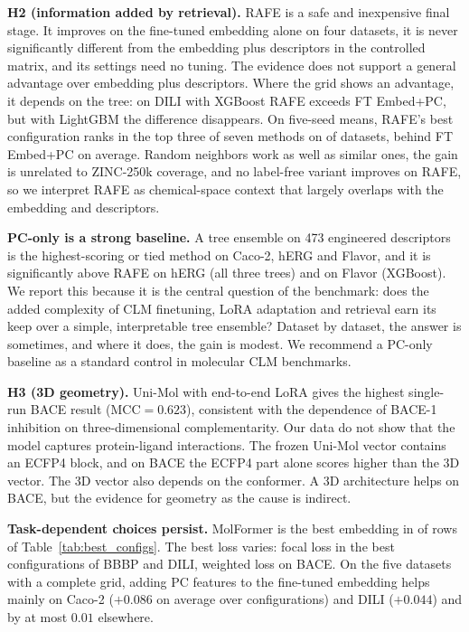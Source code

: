 \documentclass[pdflatex,sn-mathphys-num]{sn-jnl}%
\begin{document}
\textbf{H2 (information added by retrieval).} RAFE is a safe and inexpensive final stage. It improves on the fine-tuned embedding alone on four datasets, it is never significantly different from the embedding plus descriptors in the controlled matrix, and its settings need no tuning. The evidence does not support a general advantage over embedding plus descriptors. Where the grid shows an advantage, it depends on the tree: on DILI with XGBoost RAFE exceeds FT Embed+PC, but with LightGBM the difference disappears. On five-seed means, RAFE's best configuration ranks in the top three of seven methods on \ntop{} of \nds{} datasets, behind FT Embed+PC on average. Random neighbors work as well as similar ones, the gain is unrelated to ZINC-250k coverage, and no label-free variant improves on RAFE, so we interpret RAFE as chemical-space context that largely overlaps with the embedding and descriptors.

\textbf{PC-only is a strong baseline.} A tree ensemble on 473 engineered descriptors is the highest-scoring or tied method on Caco-2, hERG and Flavor, and it is significantly above RAFE on hERG (all three trees) and on Flavor (XGBoost). We report this because it is the central question of the benchmark: does the added complexity of CLM finetuning, LoRA adaptation and retrieval earn its keep over a simple, interpretable tree ensemble? Dataset by dataset, the answer is sometimes, and where it does, the gain is modest. We recommend a PC-only baseline as a standard control in molecular CLM benchmarks.

\textbf{H3 (3D geometry).} Uni-Mol with end-to-end LoRA gives the highest single-run BACE result (MCC$=0.623$), consistent with the dependence of BACE-1 inhibition on three-dimensional complementarity. Our data do not show that the model captures protein-ligand interactions. The frozen Uni-Mol vector contains an ECFP4 block, and on BACE the ECFP4 part alone scores higher than the 3D vector. The 3D vector also depends on the conformer. A 3D architecture helps on BACE, but the evidence for geometry as the cause is indirect.

\textbf{Task-dependent choices persist.} MolFormer is the best embedding in \nmf{} of \nrows{} rows of Table~\ref{tab:best_configs}. The best loss varies: focal loss in the best configurations of BBBP and DILI, weighted loss on BACE. On the five datasets with a complete grid, adding PC features to the fine-tuned embedding helps mainly on Caco-2 ($+0.086$ on average over configurations) and DILI ($+0.044$) and by at most $0.01$ elsewhere.
\end{document}
